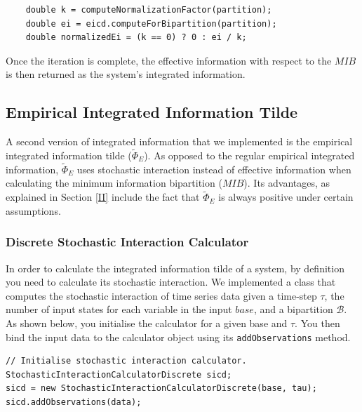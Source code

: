 \documentclass[a4paper,11pt]{article}
\begin{document}
\begin{verbatim}
	double k = computeNormalizationFactor(partition);
	double ei = eicd.computeForBipartition(partition);
	double normalizedEi = (k == 0) ? 0 : ei / k;
\end{verbatim}

Once the iteration is complete, the effective information with respect to the $MIB$ is then returned as the system's integrated information. 

\subsection{Empirical Integrated Information Tilde}
\label{sec:impl:phi-e-tilde}

A second version of integrated information that we implemented is the empirical integrated information tilde ($\widetilde{\Phi}_{E}$). As opposed to the regular empirical integrated information, $\widetilde{\Phi}_{E}$ uses stochastic interaction instead of effective information when calculating the minimum information bipartition ($MIB$). Its advantages, as explained in Section \ref{II} include the fact that $\widetilde{\Phi}_{E}$ is always positive under certain assumptions.

\subsubsection{Discrete Stochastic Interaction Calculator}
\label{sec:impl:stochastic}

In order to calculate the integrated information tilde of a system, by definition you need to calculate its stochastic interaction. We implemented a class that computes the stochastic interaction of time series data given a time-step $\tau$, the number of input states for each variable in the input $base$, and a bipartition $\mathcal{B}$. As shown below, you initialise the calculator for a given base and $\tau$. You then bind the input data to the calculator object using its \texttt{addObservations} method.

\begin{verbatim}
// Initialise stochastic interaction calculator.
StochasticInteractionCalculatorDiscrete sicd;
sicd = new StochasticInteractionCalculatorDiscrete(base, tau);
sicd.addObservations(data);
\end{verbatim}
\end{document}
